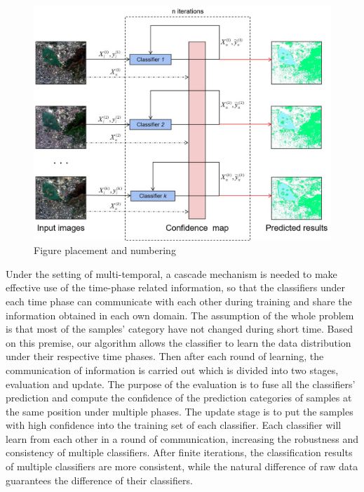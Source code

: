 \documentclass{isprs} %
\begin{document}
\begin{figure}[ht!]
	\begin{center}
			\includegraphics[width=1.0\columnwidth]{figures/images/trainClassifiers1.jpg}
		\caption{Figure placement and numbering}
	\label{fig:figure_placement}
	\end{center}
\end{figure}

Under the setting of multi-temporal, a cascade mechanism is needed to make effective use of the time-phase related information, so that the classifiers under each time phase can communicate with each other during training and share the information obtained in each own domain. The assumption of the whole problem is that most of the samples’ category have not changed during short time. Based on this premise, our algorithm allows the classifier to learn the data distribution under their respective time phases. Then after each round of learning, the communication of information is carried out which is divided into two stages, evaluation and update. The purpose of the evaluation is to fuse all the classifiers’ prediction and compute the confidence of the prediction categories of samples at the same position under multiple phases. The update stage is to put the samples with high confidence into the training set of each classifier. Each classifier will learn from each other in a round of communication, increasing the robustness and consistency of multiple classifiers. After finite iterations, the classification results of multiple classifiers are more consistent, while the natural difference of raw data guarantees the difference of their classifiers.
\end{document}
